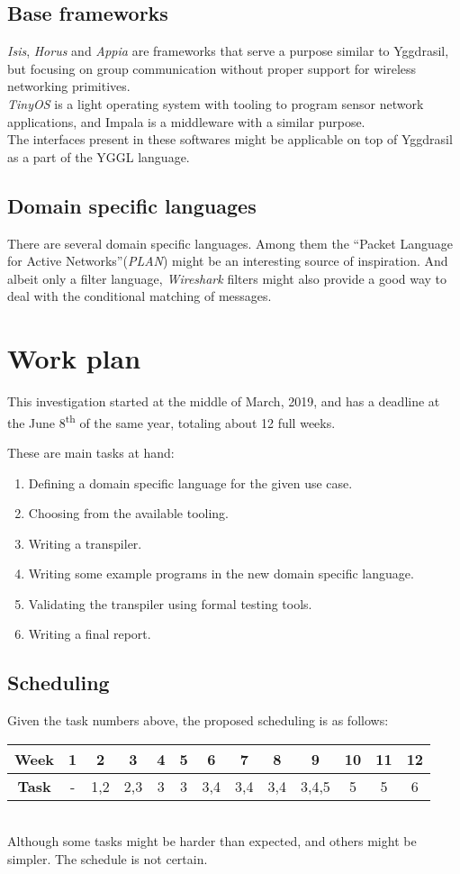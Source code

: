 \documentclass[runningheads]{llncs}
\begin{document}
\subsection*{Base frameworks}
\textit{Isis}, \textit{Horus} and \textit{Appia} are frameworks that serve a purpose similar to Yggdrasil, but focusing on group communication without proper support for wireless networking primitives.\\
\textit{TinyOS} is a light operating system with tooling to program sensor network applications, and  Impala is a middleware with a similar purpose.\\
The interfaces present in these softwares might be applicable on top of Yggdrasil as a part of the YGGL language.
\subsection*{Domain specific languages}
There are several domain specific languages. Among them the ``Packet Language for Active Networks''(\textit{PLAN}) might be an interesting source of inspiration. And albeit only a filter language, \textit{Wireshark} filters might also provide a good way to deal with the conditional matching of messages.

\section{Work plan}
This investigation started at the middle of March, 2019, and has a deadline at the June 8\textsuperscript{th} of the same year, totaling about 12 full weeks.
\par These are main tasks at hand:
\begin{enumerate}
	\item Defining a domain specific language for the given use case.
	\item Choosing from the available tooling.
	\item Writing a transpiler.
	\item Writing some example programs in the new domain specific language.
	\item Validating the transpiler using formal testing tools.
	\item Writing a final report.
\end{enumerate}
\subsection{Scheduling}
Given the task numbers above, the proposed scheduling is as follows:
\begin{table}
\centering
\begin{tabular}{c|c|c|c|c|c|c|c|c|c|c|c|c}
\hline
\textbf{Week} & 1 & 2   & 3   & 4 & 5 & 6   & 7   & 8   & 9     & 10 & 11 & 12 \\ \hline
\textbf{Task} & - & 1,2 & 2,3 & 3 & 3 & 3,4 & 3,4 & 3,4 & 3,4,5 & 5  & 5  & 6  \\ \hline
\end{tabular}
\end{table}\\
Although some tasks might be harder than expected, and others might be simpler. The schedule is not certain.



\end{document}
